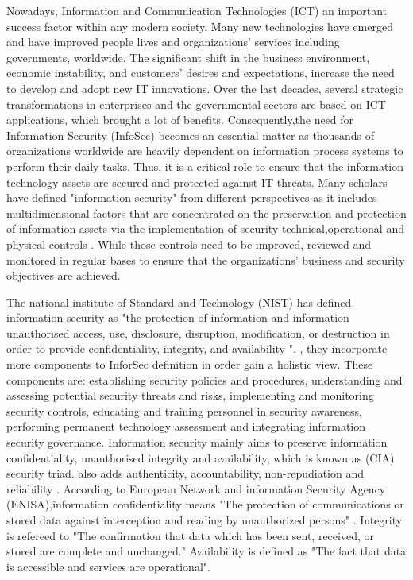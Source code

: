 Nowadays, Information and Communication Technologies (ICT) an important success factor within any modern society. Many new technologies have emerged and have improved people lives and organizations’ services including governments, worldwide. The significant shift in the business environment, economic instability, and customers’ desires and expectations, increase the need to develop and adopt new IT innovations. Over the last decades, several strategic transformations in enterprises and the governmental sectors are based on ICT applications, which brought a lot of benefits. Consequently,the need for Information Security (InfoSec) becomes an essential matter as thousands of organizations worldwide are heavily dependent on information process systems to perform their daily tasks. Thus, it is a critical role to ensure that the information technology assets are secured and protected against IT threats.
Many scholars have defined "information security" from different perspectives as it includes multidimensional factors that are concentrated on the preservation and protection of information assets via the implementation of security technical,operational and physical controls \cite{Hamid2014,Posthumus2004}. While those controls  need to be improved, reviewed and monitored in regular bases to ensure that the organizations' business and security objectives are achieved\cite{ISO/IEC2014}. 


The national institute of Standard and Technology (NIST)\cite{Kissel2013} has defined information security as "the protection of information and information unauthorised access, use, disclosure, disruption, modification, or destruction in order to provide confidentiality, integrity, and availability ". \citet{Zafar2009}, they incorporate more components to InforSec definition in order gain a holistic view. These components are: establishing security policies and procedures, understanding and assessing potential security threats and risks, implementing and monitoring security controls, educating and training personnel in security awareness, performing permanent technology assessment and integrating information security governance. Information security mainly aims to preserve information confidentiality, unauthorised integrity and availability, which is known as (CIA) security triad\cite{pfleeger2007security}. \citet{ISO/IEC2014} also adds authenticity, accountability, non-repudiation and reliability . According to European Network and information Security Agency (ENISA)\cite{ENISA2006},information confidentiality means "The protection of communications or stored data against interception and reading by unauthorized persons" . Integrity is refereed to "The confirmation that data which has been sent, received, or stored are complete and unchanged." Availability is defined as "The fact that data is accessible and services are operational". 


